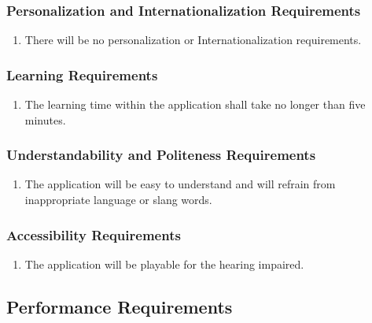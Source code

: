 \documentclass[12pt, titlepage]{article}
\begin{document}
\subsubsection{Personalization and Internationalization Requirements}
\label{ssub:personalization_and_internationalization_requirements}
\begin{enumerate}[{UH}1. ]
	\item There will be no personalization or Internationalization requirements.
\end{enumerate}

\subsubsection{Learning Requirements}
\label{ssub:learning_requirements}
\begin{enumerate}[{UH}1. ]
	\item The learning time within the application shall take no longer than five minutes.
\end{enumerate}

\subsubsection{Understandability and Politeness Requirements}
\label{ssub:understandability_and_politeness_requirements}
\begin{enumerate}[{UH}1. ]
	\item The application will be easy to understand and will refrain from inappropriate language or slang words.
\end{enumerate}

\subsubsection{Accessibility Requirements}
\label{ssub:accessibility_requirements}
\begin{enumerate}[{UH}1. ]
	\item The application will be playable for the hearing impaired.
\end{enumerate}


\subsection{Performance Requirements}
\label{sub:performance_requirements}
\end{document}
